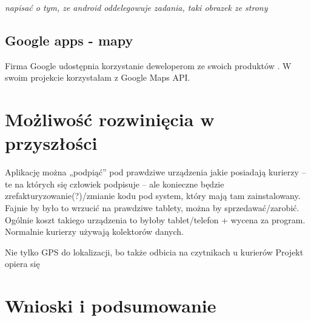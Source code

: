 \documentclass[eng,printmode,oneside]{mgr}
\begin{document}
\emph{\color{komentarz}napisać o tym, ze android oddelegowuje zadania, taki
obrazek ze strony}

\section{Google apps - mapy}

Firma Google udostępnia korzystanie deweloperom ze swoich produktów
\cite{developer.google}. W swoim projekcie korzystałam z Google Maps API. 

\chapter{Możliwość rozwinięcia w przyszłości}
Aplikację można „podpiąć” pod prawdziwe urządzenia jakie posiadają kurierzy – te na których się człowiek podpisuje – ale konieczne będzie 
zrefakturyzowanie(?)/zmianie kodu pod system, który mają tam zainstalowany.
	Fajnie by było to wrzucić na prawdziwe tablety, można by sprzedawać/zarobić. Ogólnie koszt takiego urządzenia to byłoby tablet/telefon 
	+ wycena za program.
	Normalnie kurierzy używają kolektorów danych.
	
	
 Nie tylko GPS do lokalizacji, bo także odbicia
na czytnikach u kurierów Projekt opiera się 

\chapter{Wnioski i podsumowanie}

\listoffigures
\listoftables
\lstlistoflistings
\end{document}
